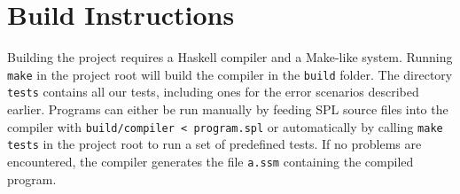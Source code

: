 \documentclass[a4paper]{article}
\begin{document}
\section{Build Instructions}

Building the project requires a Haskell compiler and a Make-like system.
Running \verb|make| in the project root will build the compiler in the \verb|build| folder.
The directory \verb|tests| contains all our tests, including ones for the error scenarios described earlier.
Programs can either be run manually by feeding SPL source files into the compiler with \verb|build/compiler < program.spl| or automatically by calling \verb|make tests| in the project root to run a set of predefined tests.
If no problems are encountered, the compiler generates the file \verb|a.ssm| containing the compiled program.
\end{document}
